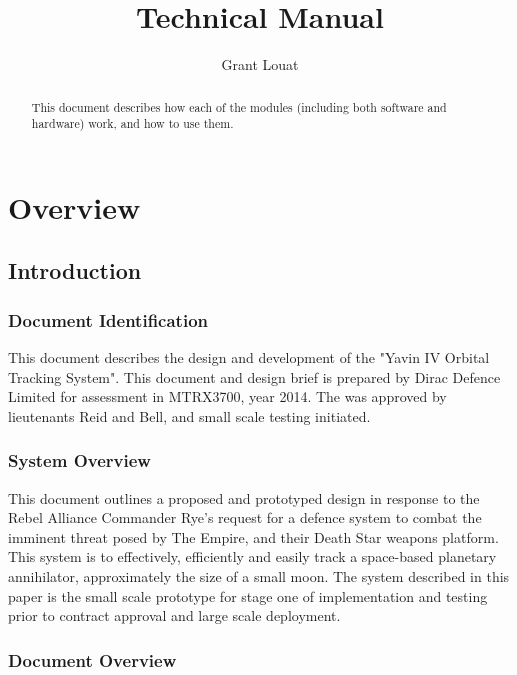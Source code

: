 \documentclass[]{report}
\title{Technical Manual}
\author{Grant Louat}
\begin{document}
\maketitle

\begin{abstract}
	This document describes how each of the modules (including both software and hardware) work, and how to use them.
\end{abstract}

\part{Overview}
\chapter{Introduction}
\section{Document Identification}
This document describes the design and development of the "Yavin IV Orbital Tracking System".  This document and design brief is prepared by Dirac Defence Limited for assessment in MTRX3700, year 2014. The was approved by lieutenants Reid and Bell, and small scale testing initiated. 

\section{System Overview}

This document outlines a proposed and prototyped design in response to the Rebel Alliance Commander Rye's request for a defence system to combat the imminent threat posed by The Empire, and their Death Star weapons platform. This system is to effectively, efficiently and easily track a space-based planetary annihilator, approximately the size of a small moon.\newline
The system described in this paper is the small scale prototype for stage one of implementation and testing prior to contract approval and large scale deployment.

\section{Document Overview}
\end{document}
